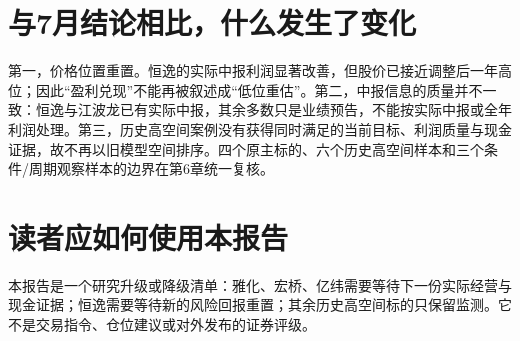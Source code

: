 \section{与7月结论相比，什么发生了变化}

第一，价格位置重置。恒逸的实际中报利润显著改善，但股价已接近调整后一年高位；因此“盈利兑现”不能再被叙述成“低位重估”。第二，中报信息的质量并不一致：恒逸与江波龙已有实际中报，其余多数只是业绩预告，不能按实际中报或全年利润处理。第三，历史高空间案例没有获得同时满足的当前目标、利润质量与现金证据，故不再以旧模型空间排序。四个原主标的、六个历史高空间样本和三个条件/周期观察样本的边界在第6章统一复核。

\section{读者应如何使用本报告}

本报告是一个研究升级或降级清单：雅化、宏桥、亿纬需要等待下一份实际经营与现金证据；恒逸需要等待新的风险回报重置；其余历史高空间标的只保留监测。它不是交易指令、仓位建议或对外发布的证券评级。
